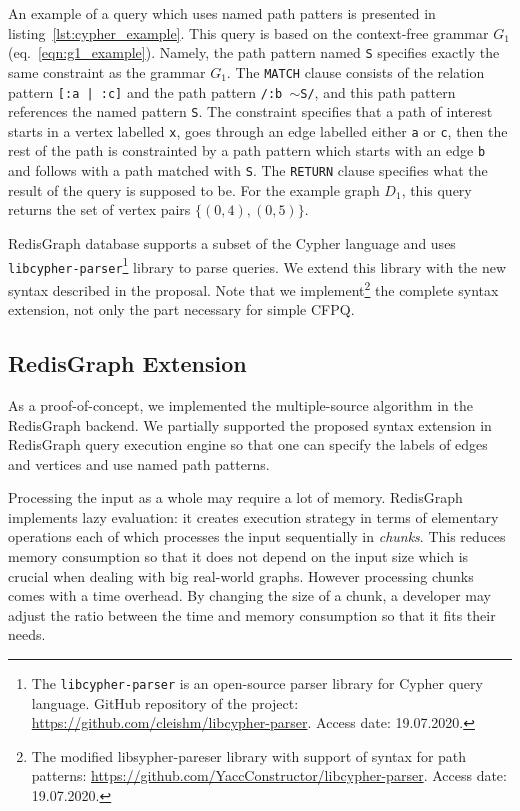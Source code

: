 An example of a query which uses named path patters is presented in listing~\ref{lst:cypher_example}.
This query is based on the context-free grammar $G_1$ (eq.~\ref{eqn:g1_example}).
Namely, the path pattern named \texttt{S} specifies exactly the same constraint as the grammar $G_1$.
The \texttt{MATCH} clause consists of the relation pattern \texttt{[:a | :c]} and the path pattern \texttt{/:b $\sim$S/}, and this path pattern references the named pattern \texttt{S}.
The constraint specifies that a path of interest starts in a vertex labelled \texttt{x}, goes through an edge labelled either \texttt{a} or \texttt{c}, then the rest of the path is constrainted by a path pattern which starts with an edge \texttt{b} and follows with a path matched with \texttt{S}.
The \texttt{RETURN} clause specifies what the result of the query is supposed to be.
For the example graph $D_1$, this query returns the set of vertex pairs $\{(0, 4), (0, 5)\}$.

RedisGraph database supports a subset of the Cypher language and uses \texttt{libcypher-parser}\footnote{The \texttt{libcypher-parser} is an open-source parser library for Cypher query language. GitHub repository of the project: \url{https://github.com/cleishm/libcypher-parser}. Access date: 19.07.2020.} library to parse queries.
We extend this library with the new syntax described in the proposal.
Note that we implement\footnote{The modified libsypher-pareser library with support of syntax for path patterns: \url{https://github.com/YaccConstructor/libcypher-parser}. Access date: 19.07.2020.} the complete syntax extension, not only the part necessary for simple CFPQ.

\subsection{RedisGraph Extension}

As a proof-of-concept, we implemented the multiple-source algorithm in the RedisGraph backend.
We partially supported the proposed syntax extension in RedisGraph query execution engine so that one can specify the labels of edges and vertices and use named path patterns.

Processing the input as a whole may require a lot of memory.
RedisGraph implements lazy evaluation: it creates execution strategy in terms of elementary operations each of which processes the input sequentially in \emph{chunks}.
This reduces memory consumption so that it does not depend on the input size which is crucial when dealing with big real-world graphs.
However processing chunks comes with a time overhead.
By changing the size of a chunk, a developer may adjust the ratio between the time and memory consumption so that it fits their needs.

